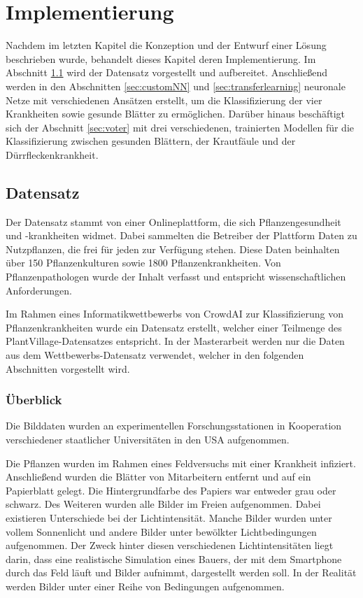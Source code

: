 \chapter{Implementierung}
\label{chapter:implementierung}

Nachdem im letzten Kapitel die Konzeption und der Entwurf einer Lösung beschrieben wurde, behandelt dieses Kapitel deren Implementierung. Im Abschnitt \ref{sec:datensatz} wird der Datensatz vorgestellt und aufbereitet. Anschließend werden in den Abschnitten \ref{sec:customNN} und \ref{sec:transferlearning} neuronale Netze mit verschiedenen Ansätzen erstellt, um die Klassifizierung der vier Krankheiten sowie gesunde Blätter zu ermöglichen. Darüber hinaus beschäftigt sich der Abschnitt \ref{sec:voter} mit drei verschiedenen, trainierten Modellen für die Klassifizierung zwischen gesunden Blättern, der Krautfäule und der Dürrfleckenkrankheit.

\section{Datensatz}
\label{sec:datensatz}
Der Datensatz stammt von einer Onlineplattform\cite{plantvillage}, die sich Pflanzengesundheit und -krankheiten widmet. Dabei sammelten die Betreiber der Plattform Daten zu Nutzpflanzen, die frei für jeden zur Verfügung stehen. Diese Daten beinhalten über 150 Pflanzenkulturen sowie 1800 Pflanzenkrankheiten. Von Pflanzenpathologen wurde der Inhalt verfasst und entspricht wissenschaftlichen Anforderungen.

Im Rahmen eines Informatikwettbewerbs von CrowdAI\cite{crowdai} zur Klassifizierung von Pflanzenkrankheiten wurde ein Datensatz erstellt, welcher einer Teilmenge des PlantVillage-Datensatzes entspricht. In der Masterarbeit werden nur die Daten aus dem Wettbewerbs-Datensatz verwendet, welcher in den folgenden Abschnitten vorgestellt wird\cite{dataset}. 

\subsection{Überblick}

Die Bilddaten wurden an experimentellen Forschungsstationen in Kooperation verschiedener staatlicher Universitäten in den USA aufgenommen\cite{dataset}.

Die Pflanzen wurden im Rahmen eines Feldversuchs mit einer Krankheit infiziert. Anschließend wurden die Blätter von Mitarbeitern entfernt und auf ein Papierblatt gelegt. Die Hintergrundfarbe des Papiers war entweder grau oder schwarz. Des Weiteren wurden alle Bilder im Freien aufgenommen. Dabei existieren Unterschiede bei der Lichtintensität. Manche Bilder wurden unter vollem Sonnenlicht und andere Bilder unter bewölkter Lichtbedingungen aufgenommen. Der Zweck hinter diesen verschiedenen Lichtintensitäten liegt darin, dass eine realistische Simulation eines Bauers, der mit dem Smartphone durch das Feld läuft und Bilder aufnimmt, dargestellt werden soll. In der Realität werden Bilder unter einer Reihe von Bedingungen aufgenommen. 

